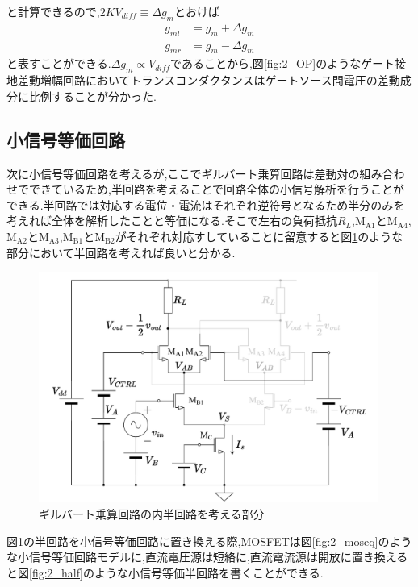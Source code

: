             と計算できるので,$2KV_{diff}\equiv\Delta g_{m}$とおけば
            \begin{align}
                g_{ml}&=g_{m}+\Delta g_{m}   \label{eq:2_dgml}\\
                g_{mr}&=g_{m}-\Delta g_{m}   \label{eq:2_dgmr}
            \end{align}
            と表すことができる.$\Delta g_{m} \propto V_{diff}$であることから,図\ref{fig:2_OP}のようなゲート接地差動増幅回路においてトランスコンダクタンスはゲートソース間電圧の差動成分に比例することが分かった.
            \newpage
            
        \subsection{小信号等価回路}
            次に小信号等価回路を考えるが,ここでギルバート乗算回路は差動対の組み合わせでできているため,半回路を考えることで回路全体の小信号解析を行うことができる.半回路では対応する電位・電流はそれぞれ逆符号となるため半分のみを考えれば全体を解析したことと等価になる.そこで左右の負荷抵抗$R_{L}$,$\mathrm{M_{A1}}$と$\mathrm{M_{A4}}$,$\mathrm{M_{A2}}$と$\mathrm{M_{A3}}$,$\mathrm{M_{B1}}$と$\mathrm{M_{B2}}$がそれぞれ対応すしていることに留意すると図\ref{fig:2_gilbert_half}のような部分において半回路を考えれば良いと分かる.
            \begin{figure}[!b]
                \centering
                \includegraphics[width=0.99\textwidth]{figures/chapter2/gilbert_half.pdf}
                \caption{ギルバート乗算回路の内半回路を考える部分}
                \label{fig:2_gilbert_half}
            \end{figure}
            図\ref{fig:2_gilbert_half}の半回路を小信号等価回路に置き換える際,MOSFETは図\ref{fig:2_moseq}のような小信号等価回路モデルに,直流電圧源は短絡に,直流電流源は開放に置き換えると図\ref{fig:2_half}のような小信号等価半回路を書くことができる.
